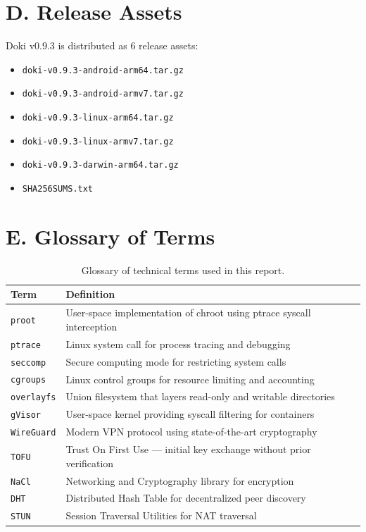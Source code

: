 \section{D. Release Assets}
\label{sec:release-assets}

Doki v0.9.3 is distributed as 6 release assets:

\begin{itemize}[leftmargin=*, itemsep=3pt]
  \item \texttt{doki-v0.9.3-android-arm64.tar.gz}
  \item \texttt{doki-v0.9.3-android-armv7.tar.gz}
  \item \texttt{doki-v0.9.3-linux-arm64.tar.gz}
  \item \texttt{doki-v0.9.3-linux-armv7.tar.gz}
  \item \texttt{doki-v0.9.3-darwin-arm64.tar.gz}
  \item \texttt{SHA256SUMS.txt}
\end{itemize}

\section{E. Glossary of Terms}
\label{sec:glossary}

\begin{table}[htbp]
  \centering
  \caption{Glossary of technical terms used in this report.}
  \label{tab:glossary}
  \begin{tabularx}{\textwidth}{l X}
    \toprule
    \textbf{Term} & \textbf{Definition} \\
    \midrule
    \texttt{proot}    & User-space implementation of chroot using ptrace syscall interception \\
    \texttt{ptrace}   & Linux system call for process tracing and debugging \\
    \texttt{seccomp}  & Secure computing mode for restricting system calls \\
    \texttt{cgroups}  & Linux control groups for resource limiting and accounting \\
    \texttt{overlayfs} & Union filesystem that layers read-only and writable directories \\
    \texttt{gVisor}   & User-space kernel providing syscall filtering for containers \\
    \texttt{WireGuard} & Modern VPN protocol using state-of-the-art cryptography \\
    \texttt{TOFU}     & Trust On First Use --- initial key exchange without prior verification \\
    \texttt{NaCl}     & Networking and Cryptography library for encryption \\
    \texttt{DHT}      & Distributed Hash Table for decentralized peer discovery \\
    \texttt{STUN}     & Session Traversal Utilities for NAT traversal \\
    \bottomrule
  \end{tabularx}
\end{table}

